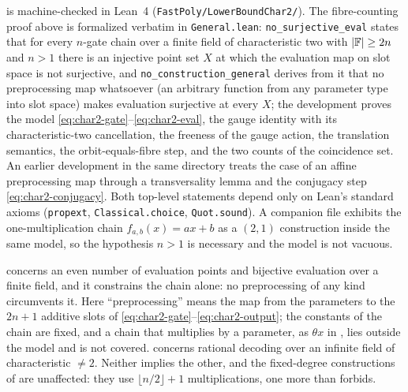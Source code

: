 \begin{remark}[Formalization]
\label{rem:char2-formalization}
 is machine-checked in Lean~4
(\texttt{FastPoly/\allowbreak LowerBoundChar2/}).  The fibre-counting proof above is
formalized verbatim in \texttt{General.lean}: \texttt{no\_surjective\_eval}
states that for every $n$-gate chain over a finite field of characteristic two
with $|\mathbb{F}|\ge2n$ and $n>1$ there is an injective point set $X$ at which the
evaluation map on slot space is not surjective, and
\texttt{no\_construction\_general} derives from it that no preprocessing map
whatsoever (an arbitrary function from any parameter type into slot space)
makes evaluation surjective at every $X$; the development proves the model
\eqref{eq:char2-gate}--\eqref{eq:char2-eval}, the gauge identity with its
characteristic-two cancellation, the freeness of the gauge action, the
translation semantics, the orbit-equals-fibre step, and the two counts of the
coincidence set.  An earlier development in the same directory treats the
case of an affine preprocessing map through a transversality lemma and the
conjugacy step \eqref{eq:char2-conjugacy}.  Both top-level statements depend
only on Lean's standard axioms (\texttt{propext}, \texttt{Classical.choice},
\texttt{Quot.sound}).  A companion file exhibits the
one-multiplication chain $f_{a,b}(x)=ax+b$ as a $(2,1)$ construction inside the same
model, so the hypothesis $n>1$ is necessary and the model is not vacuous.
\end{remark}

\begin{remark}[Scope]
\label{rem:char2-scope}
 concerns an even number of evaluation points and bijective
evaluation over a finite field, and it constrains the chain alone: no preprocessing of
any kind circumvents it.  Here ``preprocessing'' means the map from the parameters to the
$2n+1$ additive slots of \eqref{eq:char2-gate}--\eqref{eq:char2-output}; the constants of
the chain are fixed, and a chain that multiplies by a parameter, as $\theta x$ in
, lies outside the model and is not covered.   concerns rational decoding over an infinite
field of characteristic $\neq2$.  Neither implies the other, and the fixed-degree
constructions of  are unaffected: they use
$\lfloor n/2\rfloor+1$ multiplications, one more than  forbids.
\end{remark}
